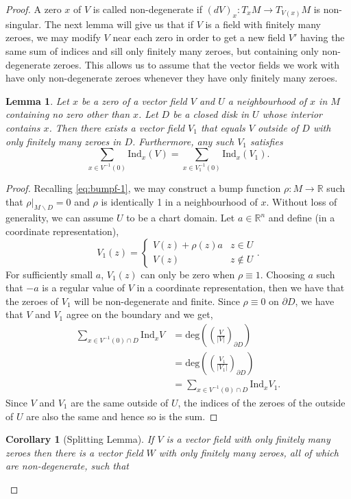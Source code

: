 \documentclass[12pt,a4paper]{article}
\numberwithin{equation}{section}
\newtheorem{lemma}{Lemma}[section]
\newtheorem{corollary}{Corollary}[section]
\theoremstyle{definition}
\theoremstyle{remark}
\begin{document}
\begin{proof}
A zero $x$ of $V$ is called non-degenerate if $(dV)_x:T_xM\to T_{V(x)}M$ is non-singular. The next lemma will give us that if $V$ is a field with finitely many zeroes, we may modify $V$ near each zero in order to get a new field $V'$ having the same sum of indices and sill only finitely many zeroes, but containing only non-degenerate zeroes. This allows us to assume that the vector fields we work with have only non-degenerate zeroes whenever they have only finitely many zeroes.  
\begin{lemma}
Let $x$ be a zero of a vector field $V$ and $U$ a neighbourhood of $x$ in $M$ containing no zero other than $x$. Let $D$ be a closed disk in $U$ whose interior contains $x$. Then there exists a vector field $V_1$ that equals $V$ outside of $D$ with only finitely many zeroes in $D$. Furthermore, any such $V_1$ satisfies
\[
\sum_{x\in V^{-1}(0)}\mathrm{Ind}_x(V)=\sum_{x\in V_1^{-1}(0)}\mathrm{Ind}_x(V_1).
\] 
\end{lemma}
\begin{proof}
Recalling \eqref{eq:bumpf-1}, we may construct a bump function $\rho:M\to\mathbb{R}$ such that $\rho\rvert_{M\backslash D}=0$ and $\rho$ is identically 1 in a neighbourhood of $x$. Without loss of generality, we can assume $U$ to be a chart domain. Let $a\in\mathbb{R}^n$ and define (in a coordinate representation),
\[
V_1(z)=\begin{cases}
V(z)+\rho(z)a & z\in U\\
V(z) & z\notin U
\end{cases}.
\] 
For sufficiently small $a$, $V_1(z)$ can only be zero when $\rho\equiv 1$. Choosing $a$ such that $-a$ is a regular value of $V$ in a coordinate representation, then we have that the zeroes of $V_1$ will be non-degenerate and finite. Since $\rho\equiv 0$ on $\partial D$, we have that $V$ and $V_1$ agree on the boundary and we get,
\begin{align*}
\sum_{x\in V^{-1}(0)\cap D}\mathrm{Ind}_xV&=\mathrm{deg}\left(\left(\frac{V}{|V|}\right)_{\partial D} \right)\\
&=\mathrm{deg}\left(\left(\frac{V_1}{|V_1|}\right)_{\partial D}\right)\\
&=\sum_{x\in V^{-1}(0)\cap D}\mathrm{Ind}_xV_1.
\end{align*}
Since $V$ and $V_1$ are the same outside of $U$, the indices of the zeroes of the outside of $U$ are also the same and hence so is the sum.
\end{proof}
\begin{corollary}[Splitting Lemma]
If $V$ is a vector field with only finitely many zeroes then there is a vector field $W$ with only finitely many zeroes, all of which are non-degenerate, such that

\end{corollary}
\end{proof}
\end{document}
